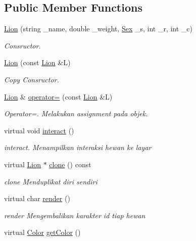 \subsection*{Public Member Functions}
\begin{DoxyCompactItemize}
\item 
\hyperlink{classLion_a313e00fc3a3f6d5a933f9df8c49b1630}{Lion} (string \+\_\+name, double \+\_\+weight, \hyperlink{sex_8h_a2633cb393c68bb2ee8080db58fb7ba93}{Sex} \+\_\+s, int \+\_\+r, int \+\_\+c)
\begin{DoxyCompactList}\small\item\em Consructor. \end{DoxyCompactList}\item 
\hyperlink{classLion_ad8f1422453d3eddb895596db203b6af0}{Lion} (const \hyperlink{classLion}{Lion} \&L)
\begin{DoxyCompactList}\small\item\em Copy Consructor. \end{DoxyCompactList}\item 
\hyperlink{classLion}{Lion} \& \hyperlink{classLion_abad282e42c825207050e3046f5ac118c}{operator=} (const \hyperlink{classLion}{Lion} \&L)
\begin{DoxyCompactList}\small\item\em Operator=. Melakukan assignment pada objek. \end{DoxyCompactList}\item 
virtual void \hyperlink{classLion_a4e12205d48a96d7cc32c8fa45cd1f5e0}{interact} ()
\begin{DoxyCompactList}\small\item\em interact. Menampilkan interaksi hewan ke layar \end{DoxyCompactList}\item 
virtual \hyperlink{classLion}{Lion} $\ast$ \hyperlink{classLion_a7c094b9988d5d1dae6136bca49f3b91b}{clone} () const 
\begin{DoxyCompactList}\small\item\em clone Menduplikat diri sendiri \end{DoxyCompactList}\item 
virtual char \hyperlink{classLion_a8a827731ad01527ff54bdd9a8e3a8f50}{render} ()
\begin{DoxyCompactList}\small\item\em render Mengembalikan karakter id tiap hewan \end{DoxyCompactList}\item 
virtual \hyperlink{color_8h_ab87bacfdad76e61b9412d7124be44c1c}{Color} \hyperlink{classLion_a152121feca5df18cb8a76cadb37770e1}{get\+Color} ()

\end{DoxyCompactItemize}
